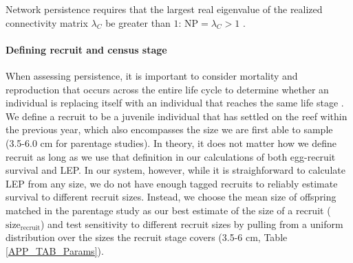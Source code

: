\documentclass[12pt, oneside]{article}   	%
\begin{document}
Network persistence requires that the largest real eigenvalue of the realized connectivity matrix $\lambda_C$ be greater than $1$: $\text{NP} = \lambda_C > 1$ \citep[e.g.][]{hastings_persistence_2006, white_population_2010, burgess2014beyond}.

\paragraph*{Defining recruit and census stage} %

When assessing persistence, it is important to consider mortality and reproduction that occurs across the entire life cycle to determine whether an individual is replacing itself with an individual that reaches the same life stage \citep{burgess2014beyond}. We define a recruit to be a juvenile individual that has settled on the reef within the previous year, which also encompasses the size we are first able to sample (3.5-6.0 cm for parentage studies). In theory, it does not matter how we define recruit as long as we use that definition in our calculations of both egg-recruit survival and LEP. In our system, however, while it is straighforward to calculate LEP from any size, we do not have enough tagged recruits to reliably estimate survival to different recruit sizes. Instead, we choose the mean size of offspring matched in the parentage study as our best estimate of the size of a recruit ($\text{size}_\text{recruit}$) and test sensitivity to different recruit sizes by pulling from a uniform distribution over the sizes the recruit stage covers (3.5-6 cm, Table \ref{APP_TAB_Params}).

\end{document}
